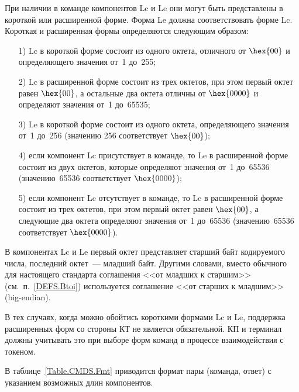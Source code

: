При наличии в команде компонентов Lc и Le они могут быть представлены 
в короткой или расширенной форме. Форма Le должна соответствовать форме Lc. 
%
Короткая и расширенная формы определяются следующим образом: 
\begin{enumerate}
\item[1)]
Lc в короткой форме состоит из одного октета, отличного от $\hex{00}$ и
определяющего значения от~1 до~255;

\item[2)] 
Lc в расширенной форме состоит из трех октетов, при этом первый октет равен
$\hex{00}$, а остальные два октета отличны от $\hex{0000}$ и определяют
значения от~1 до~65535;

\item[3)] 
Le в короткой форме состоит из одного октета, определяющего значения от~1
до~256 (значению 256 соответствует $\hex{00}$);

\item[4)] 
если компонент Lc присутствует в команде, то Le в расширенной форме состоит
из двух октетов, которые определяют значения от~1 до~65536 (значению~65536
соответствует $\hex{0000}$);

\item[5)] 
если компонент Lc отсутствует в команде, то Le в расширенной форме состоит
из трех октетов, при этом первый октет равен $\hex{00}$, а следующие два
октета определяют значения от~1 до~65536 (значению~65536 соответствует
$\hex{0000}$).
\end{enumerate}

В компонентах Lc и Le первый октет представляет старший байт кодируемого числа, 
последний октет~--- младший байт. Другими словами, вместо обычного для 
настоящего стандарта соглашения <<от младших к старшим>> 
(см.~п.~\ref{DEFS.Btoi}) используется соглашение <<от старших к младшим>>  
(big-endian).

В тех случаях, когда можно обойтись короткими формами Lc и Le, 
поддержка расширенных форм со стороны КТ не является обязательной.
КП и терминал должны учитывать это при выборе форм команд в процессе 
взаимодействия с токеном.

В таблице~\ref{Table.CMDS.Fmt} приводится формат пары (команда, ответ) 
с указанием возможных длин компонентов.

